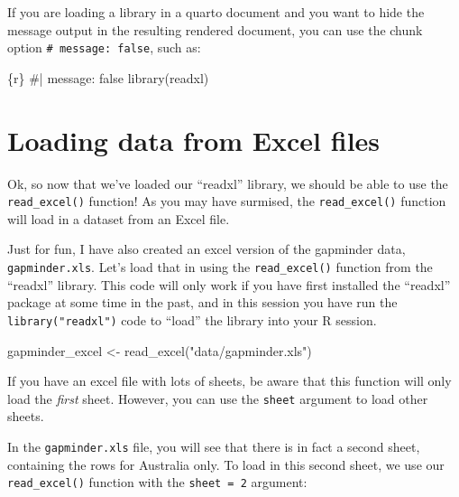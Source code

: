 \documentclass[
  letterpaper,
  DIV=11,
  numbers=noendperiod]{scrreprt}
\newenvironment{Shaded}{\begin{snugshade}}{\end{snugshade}}
\newcommand{\FunctionTok}[1]{\textcolor[rgb]{0.28,0.35,0.67}{#1}}
\newcommand{\InformationTok}[1]{\textcolor[rgb]{0.37,0.37,0.37}{#1}}
\newcommand{\NormalTok}[1]{\textcolor[rgb]{0.00,0.23,0.31}{#1}}
\newcommand{\OtherTok}[1]{\textcolor[rgb]{0.00,0.23,0.31}{#1}}
\newcommand{\StringTok}[1]{\textcolor[rgb]{0.13,0.47,0.30}{#1}}
\begin{document}
If you are loading a library in a quarto document and you want to hide
the message output in the resulting rendered document, you can use the
chunk option \texttt{\#\textbar{}\ message:\ false}, such as:

\begin{Shaded}
\begin{Highlighting}[]
\InformationTok{\textasciigrave{}\textasciigrave{}\textasciigrave{}\{r\}}
\InformationTok{\#| message: false}
\InformationTok{library(readxl)}
\InformationTok{\textasciigrave{}\textasciigrave{}\textasciigrave{}}
\end{Highlighting}
\end{Shaded}

\section{Loading data from Excel
files}\label{loading-data-from-excel-files}

Ok, so now that we've loaded our ``readxl'' library, we should be able
to use the \texttt{read\_excel()} function! As you may have surmised,
the \texttt{read\_excel()} function will load in a dataset from an Excel
file.

Just for fun, I have also created an excel version of the gapminder
data, \texttt{gapminder.xls}. Let's load that in using the
\texttt{read\_excel()} function from the ``readxl'' library. This code
will only work if you have first installed the ``readxl'' package at
some time in the past, and in this session you have run the
\texttt{library("readxl")} code to ``load'' the library into your R
session.

\begin{Shaded}
\begin{Highlighting}[]
\NormalTok{gapminder\_excel }\OtherTok{\textless{}{-}} \FunctionTok{read\_excel}\NormalTok{(}\StringTok{"data/gapminder.xls"}\NormalTok{)}
\end{Highlighting}
\end{Shaded}

If you have an excel file with lots of sheets, be aware that this
function will only load the \emph{first} sheet. However, you can use the
\texttt{sheet} argument to load other sheets.

In the \texttt{gapminder.xls} file, you will see that there is in fact a
second sheet, containing the rows for Australia only. To load in this
second sheet, we use our \texttt{read\_excel()} function with the
\texttt{sheet\ =\ 2} argument:
\end{document}
